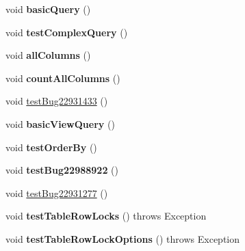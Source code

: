 \begin{DoxyCompactItemize}
\item 
\mbox{\label{classtestsuite_1_1x_1_1devapi_1_1_table_select_test_ab605b476d74b9ab2c2ec5141601f4e91}} 
void {\bfseries basic\+Query} ()
\item 
\mbox{\label{classtestsuite_1_1x_1_1devapi_1_1_table_select_test_ac0b53e53f46b498bc963c29572098c94}} 
void {\bfseries test\+Complex\+Query} ()
\item 
\mbox{\label{classtestsuite_1_1x_1_1devapi_1_1_table_select_test_a5cf2714c4dbac75f392d1920b7b82b2a}} 
void {\bfseries all\+Columns} ()
\item 
\mbox{\label{classtestsuite_1_1x_1_1devapi_1_1_table_select_test_a3754d5145287a62671e555cade171368}} 
void {\bfseries count\+All\+Columns} ()
\item 
void \mbox{\hyperlink{classtestsuite_1_1x_1_1devapi_1_1_table_select_test_afd12723c984438be5ec3f1f4c7653f12}{test\+Bug22931433}} ()
\item 
\mbox{\label{classtestsuite_1_1x_1_1devapi_1_1_table_select_test_ac765bcf8d10c468cadef1120603af0b8}} 
void {\bfseries basic\+View\+Query} ()
\item 
\mbox{\label{classtestsuite_1_1x_1_1devapi_1_1_table_select_test_a6b5dc109f28e5bff71ee771b479a5746}} 
void {\bfseries test\+Order\+By} ()
\item 
\mbox{\label{classtestsuite_1_1x_1_1devapi_1_1_table_select_test_ab8bd8f7764e85cb1fca60737990788e0}} 
void {\bfseries test\+Bug22988922} ()
\item 
void \mbox{\hyperlink{classtestsuite_1_1x_1_1devapi_1_1_table_select_test_a87677fbfc2a5861e0415b7c01ef9e558}{test\+Bug22931277}} ()
\item 
\mbox{\label{classtestsuite_1_1x_1_1devapi_1_1_table_select_test_a86c3f2a244e84e2218335ab808b0ba98}} 
void {\bfseries test\+Table\+Row\+Locks} ()  throws Exception 
\item 
\mbox{\label{classtestsuite_1_1x_1_1devapi_1_1_table_select_test_aefa93f23559107b6c1808be6604d31dc}} 
void {\bfseries test\+Table\+Row\+Lock\+Options} ()  throws Exception 
\end{DoxyCompactItemize}
